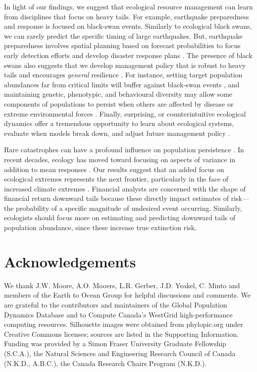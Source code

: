 In light of our findings, we suggest that ecological resource management can
learn from disciplines that focus on heavy tails. For example, earthquake
preparedness and response is focused on black-swan events. Similarly to
ecological black swans, we can rarely predict the specific timing of large
earthquakes. But, earthquake preparedness involves spatial planning based on
forecast probabilities to focus early detection efforts and develop disaster
response plans \citep{nrc2007}. The presence of black swans also suggests that we
develop management policy that is robust to heavy tails and encourages
\textit{general} resilience \citep{carpenter2012}. For instance, setting target
population abundances far from critical limits will buffer against black-swan
events \citep{caddy1996}, and maintaining genetic, phenotypic, and behavioural
diversity may allow some components of populations to persist when others are
affected by disease or extreme environmental forces \citep{schindler2010}.
Finally, surprising, or counterintuitive ecological dynamics offer a tremendous
opportunity to learn about ecological systems, evaluate when models break down,
and adjust future management policy \citep{doak2008, lindenmayer2010}.

Rare catastrophes can have a profound influence on population
persistence \citep{mangel1994}. In recent decades, ecology has moved toward
focusing on aspects of variance in addition to mean
responses \citep{thompson2013}. Our results suggest that an added focus on
ecological extremes represents the next frontier, particularly in the face of
increased climate extremes \citep{meehl2004, ipcc2012, thompson2013}. Financial
analysts are concerned with the shape of financial return downward tails
because these directly impact estimates of risk---the probability of a specific
magnitude of undesired event occurring. Similarly, ecologists should focus more
on estimating and predicting downward tails of population abundance, since
these increase true extinction risk.

\section{Acknowledgements}

We thank J.W. Moore, A.O. Mooers, L.R. Gerber, J.D.
Yeakel, C. Minto and members of the Earth to Ocean Group for helpful
discussions and comments. We are grateful to the contributors and maintainers
of the Global Population Dynamics Database and to Compute Canada's WestGrid
high-performance computing resources. Silhouette images were obtained from
phylopic.org under Creative Commons licenses; sources are listed in the
Supporting Information. Funding was provided by a Simon Fraser University
Graduate Fellowship (S.C.A.), the Natural Sciences and Engineering Research
Council of Canada (N.K.D., A.B.C.), the Canada Research Chairs Program
(N.K.D.).

